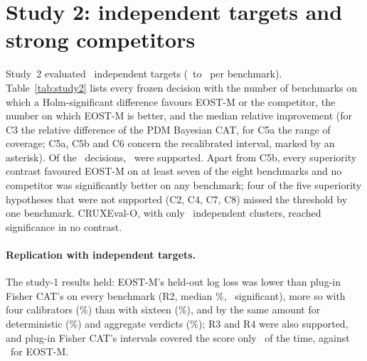 \section{Study 2: independent targets and strong competitors}
\label{sec:study2}

Study~2 evaluated \STwoTargetsTotal\ independent targets (\STwoTargetsMin\ to
\STwoTargetsMax\ per benchmark). Table~\ref{tab:study2} lists every frozen decision with the
number of benchmarks on which a Holm-significant difference favours EOST-M or the competitor,
the number on which EOST-M is better, and the median relative improvement (for C3 the
relative difference of the PDM Bayesian CAT, for C5a the range of coverage; C5a, C5b and C6
concern the recalibrated interval, marked by an asterisk). Of the \STwoNHyp\ decisions,
\STwoNSupported\ were supported. Apart from C5b, every superiority contrast favoured EOST-M
on at least seven of the eight benchmarks and no competitor was significantly better on any
benchmark; four of the five superiority hypotheses that were not supported (C2, C4, C7, C8)
missed the threshold by one benchmark. CRUXEval-O, with only \STwoTargetsMin\ independent
clusters, reached significance in no contrast.



\paragraph{Replication with independent targets.} The study-1 results held: EOST-M's
held-out log loss was lower than plug-in Fisher CAT's on every benchmark (R2, median
\STwoRTwoMed\%, \STwoRTwoFav\ significant), more so with four calibrators
(\SecRTwoNFourMed\%) than with sixteen (\SecRTwoNSixteenMed\%), and by the same amount for
deterministic (\STwoRTwoDet\%) and aggregate verdicts (\STwoRTwoAgg\%); R3 and R4 were also
supported, and plug-in Fisher CAT's intervals covered the score only \STwoCovmfipi\ of the
time, against \STwoCoveigmg\ for EOST-M.


